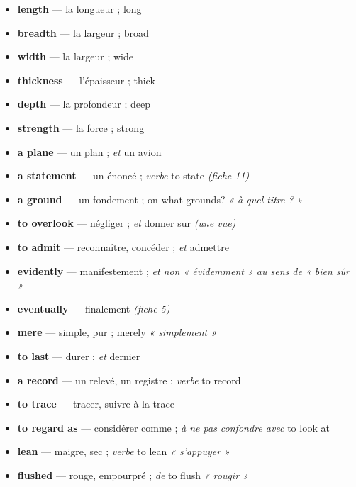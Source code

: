 \documentclass{fiche}
\begin{document}

\begin{itemize}[label=--,itemsep=0.8mm,leftmargin=*]\small
  \item \textbf{length} — la longueur ; long
  \item \textbf{breadth} — la largeur ; broad
  \item \textbf{width} — la largeur ; wide
  \item \textbf{thickness} — l'épaisseur ; thick
  \item \textbf{depth} — la profondeur ; deep
  \item \textbf{strength} — la force ; strong
  \item \textbf{a plane} — un plan ; \textit{et} un avion
  \item \textbf{a statement} — un énoncé ; \textit{verbe} to state \textit{(fiche 11)}
  \item \textbf{a ground} — un fondement ; on what grounds? \textit{« à quel titre ? »}
  \item \textbf{to overlook} — négliger ; \textit{et} donner sur \textit{(une vue)}
  \item \textbf{to admit} — reconnaître, concéder ; \textit{et} admettre
  \item \textbf{evidently} — manifestement ; \textit{et non « évidemment » au sens de « bien sûr »}
  \item \textbf{eventually} — finalement \textit{(fiche 5)}
  \item \textbf{mere} — simple, pur ; merely \textit{« simplement »}
  \item \textbf{to last} — durer ; \textit{et} dernier
  \item \textbf{a record} — un relevé, un registre ; \textit{verbe} to record
  \item \textbf{to trace} — tracer, suivre à la trace
  \item \textbf{to regard as} — considérer comme ; \textit{à ne pas confondre avec} to look at
  \item \textbf{lean} — maigre, sec ; \textit{verbe} to lean \textit{« s'appuyer »}
  \item \textbf{flushed} — rouge, empourpré ; \textit{de} to flush \textit{« rougir »}
\end{itemize}
\end{document}

